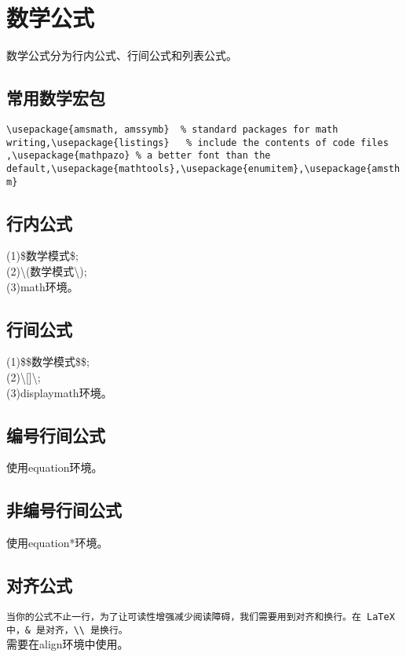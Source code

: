 \documentclass{book}%
\begin{document}
    \chapter{数学公式}
    数学公式分为行内公式、行间公式和列表公式。\\
    
    \section{常用数学宏包}
    \verb|\usepackage{amsmath, amssymb}  % standard packages for math writing,\usepackage{listings}   % include the contents of code files ,\usepackage{mathpazo} % a better font than the default,\usepackage{mathtools},\usepackage{enumitem},\usepackage{amsthm}|\\
    
    \section{行内公式}
    (1)\$数学模式\$;\\
    (2)\textbackslash(数学模式\textbackslash);\\
    (3)math环境。
    
    \section{行间公式}
    (1)\$\$数学模式\$\$;\\
    (2)\textbackslash []\textbackslash;\\
    (3)displaymath环境。
    
    \section{编号行间公式}
    使用equation环境。
    
    \section{非编号行间公式}
    使用equation*环境。
    
    \section{对齐公式}
    \verb|当你的公式不止一行，为了让可读性增强减少阅读障碍，我们需要用到对齐和换行。在 LaTeX 中，& 是对齐，\\ 是换行。|\\
    需要在align环境中使用。\\
        
\end{document}
